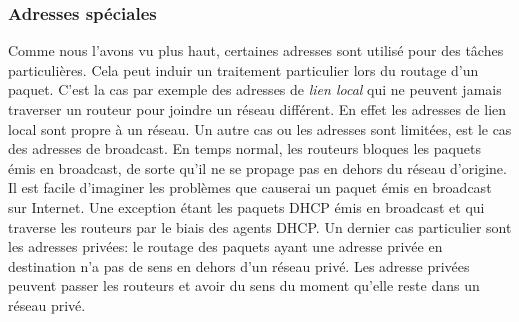 \subsubsection{Adresses spéciales}

Comme nous l'avons vu plus haut, certaines adresses sont utilisé pour des
tâches particulières. Cela peut induir un traitement particulier lors du routage
d'un paquet.  C'est la cas par exemple des adresses de {\it lien local} qui ne
peuvent jamais traverser un routeur pour joindre un réseau différent. En effet
les adresses de lien local sont propre à un réseau.
Un autre cas ou les adresses sont limitées, est le cas des adresses de broadcast.
En temps normal, les routeurs bloques les paquets émis en broadcast, de sorte qu'il ne se propage pas en dehors du réseau d'origine. Il est facile d'imaginer les problèmes que causerai un paquet émis en broadcast sur Internet. Une exception étant les paquets DHCP émis en broadcast et qui traverse les routeurs par le biais des agents DHCP.
Un dernier cas particulier sont les adresses privées: le routage des paquets ayant une adresse privée en destination n'a pas de sens en dehors d'un réseau privé. Les adresse privées peuvent passer les routeurs et avoir du sens du moment qu'elle reste dans un réseau privé.
